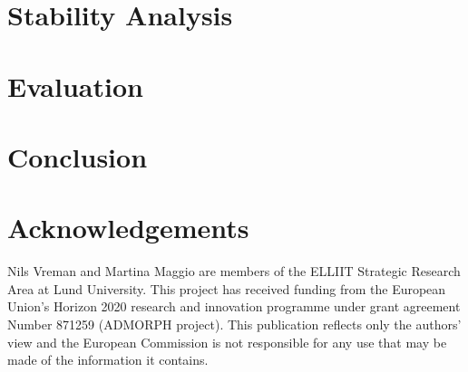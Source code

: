 \section{Stability Analysis}
\label{sec:stability}


\section{Evaluation}
\label{sec:evaluation}


\section{Conclusion}
\label{sec:conclusion}


\section*{Acknowledgements}
Nils Vreman and Martina Maggio are members of the ELLIIT Strategic Research Area at Lund University.
This project has received funding from the European Union's Horizon 2020 research and innovation programme under grant agreement Number 871259 (ADMORPH project).
This publication reflects only the authors' view and the European Commission is not responsible for any use that may be made of the information it contains.



\printbibliography[heading=subbibliography]
